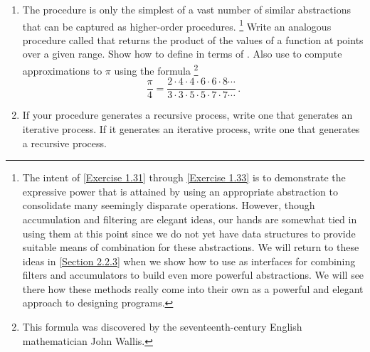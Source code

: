 \begin{exercise}
	\label{Exercise 1.31}
	\begin{enumerate}[label = \alph*., leftmargin = *]

		\item
			The  procedure is only the simplest of a vast number of similar abstractions that can be captured as higher-order procedures.%
			\footnote{
				The intent of \cref{Exercise 1.31} through \cref{Exercise 1.33} is to demonstrate the expressive power that is attained by using an appropriate abstraction to consolidate many seemingly disparate operations.
				However, though accumulation and filtering are elegant ideas, our hands are somewhat tied in using them at this point since we do not yet have data structures to provide suitable means of combination for these abstractions.
				We will return to these ideas in \cref{Section 2.2.3} when we show how to use  as interfaces for combining filters and accumulators to build even more powerful abstractions.
				We will see there how these methods really come into their own as a powerful and elegant approach to designing programs.
			}
			Write an analogous procedure called  that returns the product of the values of a function at points over a given range.
			Show how to define  in terms of .
			Also use  to compute approximations to \( π \) using the formula%
			\footnote{
				This formula was discovered by the seventeenth-century English mathematician John Wallis.
			}
			\[
				\frac{π}{4}
				=
				\frac{2 ⋅ 4 ⋅ 4 ⋅ 6 ⋅ 6 ⋅ 8 \dotsm}{3 ⋅ 3 ⋅ 5 ⋅ 5 ⋅ 7 ⋅ 7 \dotsm} \,.
			\]

		\item
			If your  procedure generates a recursive process, write one that generates an iterative process.
			If it generates an iterative process, write one that generates a recursive process.

	\end{enumerate}
\end{exercise}



